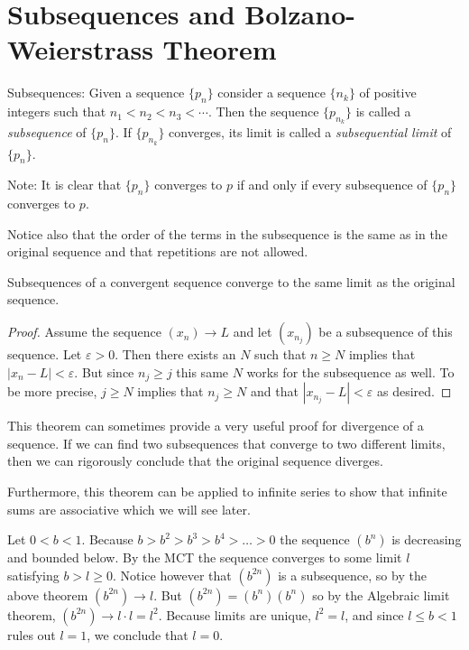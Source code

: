 \section{Subsequences and Bolzano-Weierstrass Theorem}

\begin{definition}Subsequences:  Given a sequence $\{p_n\}$ consider a sequence $\{n_k\}$ of positive integers such that $n_1 < n_2 < n_3 < \cdots$.  Then the sequence $\{p_{n_k}\}$ is called a \emph{subsequence} of $\{p_n\}$.  If $\{p_{n_k}\}$ converges, its limit is called a \emph{subsequential limit} of $\{p_{n}\}$.
\end{definition}
\medskip
Note:  It is clear that $\{p_{n}\}$ converges to $p$ if and only if every subsequence of $\{p_{n}\}$ converges to $p$. 

Notice also that the order of the terms in the subsequence is the same as in the original sequence and that repetitions are not allowed.

\begin{theorem} Subsequences of a convergent sequence converge to the same limit as the original sequence.\end{theorem}

\begin{proof} 
Assume the sequence $(x_n) \to L$ and let $(x_{n_j})$ be a subsequence of this sequence.  
Let $\varepsilon > 0$.  Then there exists an $N$ such that $n \geq N$ implies that $|x_n - L| < \varepsilon$.  But since $n_j \geq j$ this same $N$ works for the subsequence as well.  To be more precise, $j\geq N$ implies that $n_j \geq N$ and that $|x_{n_j} - L| < \varepsilon$ as desired.


\end{proof}

This theorem can sometimes provide a very useful proof for divergence of a sequence.  If we can find two subsequences that converge to two different limits, then we can rigorously conclude that the original sequence diverges.

Furthermore, this theorem can be applied to infinite series to show that infinite sums are associative which we will see later.

\begin{example} Let $0 < b< 1$.  Because $b >b^2 > b^3 > b^4 > \ldots > 0$ the sequence $(b^n)$ is decreasing and bounded below.  By the MCT the sequence converges to some limit $l$ satisfying $b > l \geq 0$.   Notice however that $(b^{2n})$ is a subsequence, so by the above theorem $(b^{2n}) \to l$. But $(b^{2n}) = (b^n)( b^n)$ so by the Algebraic limit theorem, $(b^{2n}) \to l \cdot l = l^2$.  Because limits are unique, $l^2 = l$, and since $l \leq b < 1$ rules out $l = 1$, we conclude that $l=0$.
\end{example}

